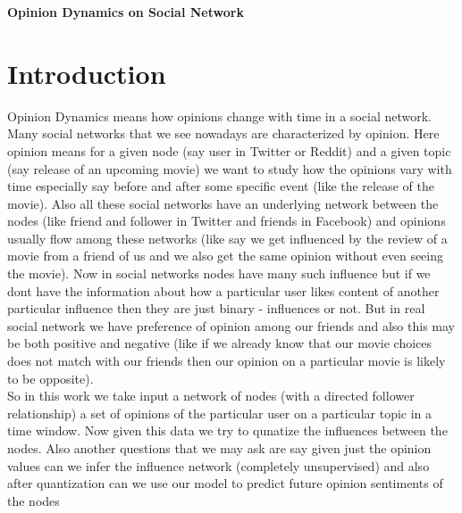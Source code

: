 \clearpage
{}
\begin{center}
\huge{\textbf{Opinion Dynamics on Social Network}} 
\end{center}
\clearpage
\newcommand{\twopartdef}[4]
{
	\left\{
		\begin{array}{ll}
			#1 & \mbox{if } #2 \\
			#3 & \mbox{if } #4 
		\end{array}
	\right.
}
\section*{Introduction}
Opinion Dynamics means how opinions change with time in a social network. Many social networks that we see nowadays are characterized by opinion. Here opinion means for a given node (say user in Twitter or Reddit) and a given topic (say release of an upcoming movie) we want to study how the opinions vary with time especially say before and after some specific event (like the release of the movie). Also all these social networks have an underlying network between the nodes (like friend and follower in Twitter and friends in Facebook) and opinions usually flow among these networks (like say we get influenced by the review of a movie from a friend of us and we also get the same opinion without even seeing the movie). Now in social networks nodes have many such influence but if we dont have the information about how a particular user likes content of another particular influence then they are just binary - influences or not. But in real social network we have preference of opinion among our friends and also this may be both positive and negative (like if we already know that our movie choices does not match with our friends then our opinion on a particular movie is likely to be opposite).
\\
So in this work we take input a network of nodes (with a directed follower relationship) a set of opinions of the particular user on a particular topic in a time window. Now given this data we try to qunatize the influences between the nodes. Also another questions that we may ask are say given just the opinion values can we infer the influence network (completely unsupervised) and also after quantization can we use our model to predict future opinion sentiments of the nodes
\\
